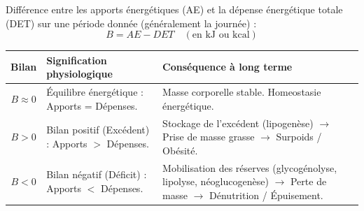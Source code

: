 \documentclass[11pt]{article}
\newcommand{\cle}[1]{{\popxbold\color{popdark}#1}}
\begin{document}
\begin{definition}
Diff\'erence entre les apports \'energ\'etiques (AE) et la d\'epense \'energ\'etique totale (DET) sur une p\'eriode donn\'ee (g\'en\'eralement la journ\'ee) :
\[
B = AE - DET \quad (\text{en kJ ou kcal})
\]
\end{definition}

\begin{propriete}
\begin{center}
\begin{tabularx}{\linewidth}{|c|X|X|}\hline
\rowcolor{popblueL} \textbf{Bilan} & \textbf{Signification physiologique} & \textbf{Cons\'equence \`a long terme} \\ \hline
$B \approx 0$ & \cle{\'Equilibre \'energ\'etique} : Apports = D\'epenses. & Masse corporelle stable. Homeostasie \'energ\'etique. \\ \hline
$B > 0$ & \cle{Bilan positif} (Exc\'edent) : Apports $>$ D\'epenses. & Stockage de l'exc\'edent (lipogen\`ese) $\rightarrow$ Prise de masse grasse $\rightarrow$ Surpoids / Ob\'esit\'e. \\ \hline
$B < 0$ & \cle{Bilan n\'egatif} (D\'eficit) : Apports $<$ D\'epenses. & Mobilisation des r\'eserves (glycog\'enolyse, lipolyse, n\'eoglucogen\`ese) $\rightarrow$ Perte de masse $\rightarrow$ D\'enutrition / \'Epuisement. \\ \hline
\end{tabularx}
\end{center}
\end{propriete}
\end{document}
